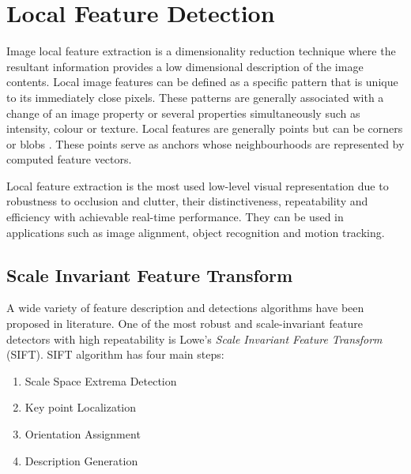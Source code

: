 \documentclass{l4proj}
\begin{document}
\section{Local Feature Detection}



Image local feature extraction is a dimensionality reduction technique where the resultant information provides a low dimensional description of the image contents. Local image features can be defined as a specific pattern that is unique to its immediately close pixels. These patterns are generally associated with a change of an image property or several properties simultaneously such as intensity, colour or texture. Local features are generally points but can be corners or blobs \citep{Tinne08}. These points serve as anchors whose neighbourhoods are represented by computed feature vectors. 

Local feature extraction is the most used low-level visual representation due to robustness to occlusion and clutter, their distinctiveness, repeatability and efficiency with achievable real-time performance. They can be used in applications such as image alignment, object recognition and motion tracking.   


\subsection{Scale Invariant Feature Transform}

A wide variety of feature description and detections algorithms have been proposed in literature. One of the most robust and scale-invariant feature detectors with high repeatability is Lowe's \textit{Scale Invariant Feature Transform} (SIFT). SIFT algorithm has four main steps:





\begin{enumerate}
  \item Scale Space Extrema Detection
  \item Key point Localization
  \item Orientation Assignment
  \item Description Generation 
\end{enumerate}

\hspace{1pt}
\end{document}
